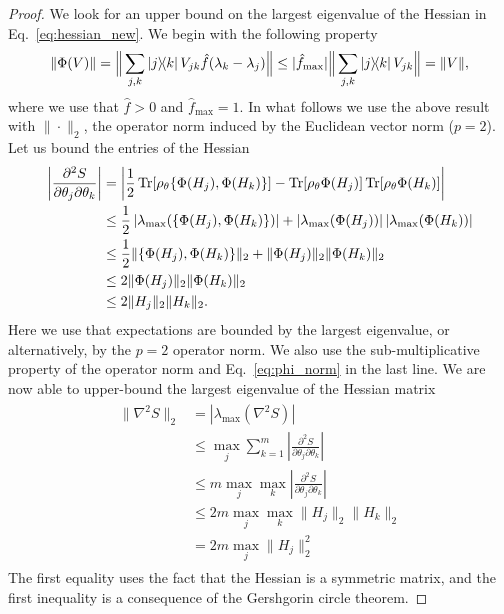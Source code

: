 \documentclass[
    aps,
    prx,
    onecolumn
]{revtex4-2}
\begin{document}
\begin{proof}
We look for an upper bound on the largest eigenvalue of the Hessian in Eq.~\eqref{eq:hessian_new}. 
We begin with the following property
\begin{align}
\label{eq:phi_norm}
    \| \Phi(V) \| = \Big \| \sum_{j,k} \ketbra{j}{k} V_{jk} \hat{f}(\lambda_k - \lambda_j) \Big \| \leq | \hat{f}_{\max} | \Big \| \sum_{j,k} \ketbra{j}{k} V_{jk} \Big \| = \| V \| ,
\end{align}
where we use that $\hat{f}>0$ and $\hat{f}_{\max} = 1$. In what follows we use the above result with $\| \cdot \|_2$, the operator norm induced by the Euclidean vector norm ($p=2$). 
Let us bound the entries of the Hessian
\begin{align}
\begin{split}
    \left| \frac{\partial^2 S}{\partial \theta_{j} \partial \theta_{k}} \right| &= \left | \frac{1}{2} \Tr[ \rho_\theta \{ \Phi(H_j), \Phi(H_k) \}] - \Tr[ \rho_\theta \Phi(H_j)] \Tr[ \rho_\theta \Phi(H_k)] \right| \\
    &\leq \frac{1}{2}  \left | \lambda_{\max}( \{ \Phi(H_j), \Phi(H_k) \} ) \right| + \left | \lambda_{\max}( \Phi(H_j) ) \right|  \left | \lambda_{\max} ( \Phi(H_k) ) \right| \\
    &\leq \frac{1}{2} \| \{\Phi(H_j), \Phi(H_k)\} \|_2 +  \| \Phi(H_j) \|_2 \| \Phi(H_k) \|_2 \\ 
    &\leq 2 \| \Phi(H_j) \|_2 \| \Phi(H_k) \|_2 \\
    &\leq 2 \| H_j \|_2 \| H_k \|_2 .
\end{split}
\end{align}
Here we use that expectations are bounded by the largest eigenvalue, or alternatively, by the $p=2$ operator norm. We also use the sub-multiplicative property of the operator norm and Eq.~\eqref{eq:phi_norm} in the last line. 
We are now able to upper-bound the largest eigenvalue of the Hessian matrix
\begin{align}
\begin{split}
\label{eq:hess_upper_bound}
\| \nabla^2 S \|_2 &= | \lambda_\mathrm{max}(\nabla^2 S)| \\
&\leq \max_j \sum_{k=1}^m  \left| \frac{\partial^2 S}{\partial \theta_{j} \partial \theta_{k}} \right| \\
&\leq m \max_j \max_k  \left| \frac{\partial^2 S}{\partial \theta_{j} \partial \theta_{k}} \right| \\
&\leq 2m \max_j \max_k \| H_j \|_2 \| H_k \|_2 \\
&= 2 m \max_j \| H_j \|_2^2
\end{split}
\end{align}
The first equality uses the fact that the Hessian is a symmetric matrix, and the first inequality is a consequence of the Gershgorin circle theorem.


\end{proof}
\end{document}
